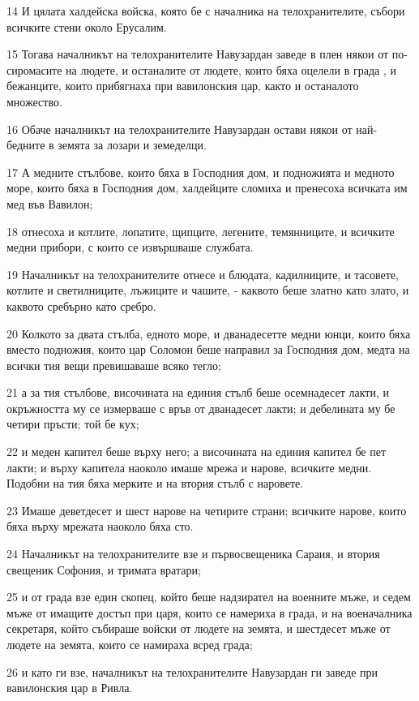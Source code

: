 \par 14 И цялата халдейска войска, която бе с началника на телохранителите, събори всичките стени около Ерусалим.
\par 15 Тогава началникът на телохранителите Навузардан заведе в плен някои от по-сиромасите на людете, и останалите от людете, които бяха оцелели в града , и бежанците, които прибягнаха при вавилонския цар, както и останалото множество.
\par 16 Обаче началникът на телохранителите Навузардан остави някои от най-бедните в земята за лозари и земеделци.
\par 17 А медните стълбове, които бяха в Господния дом, и подножията и медното море, които бяха в Господния дом, халдейците сломиха и пренесоха всичката им мед във Вавилон;
\par 18 отнесоха и котлите, лопатите, щипците, легените, темянниците, и всичките медни прибори, с които се извършваше службата.
\par 19 Началникът на телохранителите отнесе и блюдата, кадилниците, и тасовете, котлите и светилниците, лъжиците и чашите, - каквото беше златно като злато, и каквото сребърно като сребро.
\par 20 Колкото за двата стълба, едното море, и дванадесетте медни юнци, които бяха вместо подножия, които цар Соломон беше направил за Господния дом, медта на всички тия вещи превишаваше всяко тегло;
\par 21 а за тия стълбове, височината на единия стълб беше осемнадесет лакти, и окръжността му се измерваше с връв от дванадесет лакти; и дебелината му бе четири пръсти; той бе кух;
\par 22 и меден капител беше върху него; а височината на единия капител бе пет лакти; и върху капитела наоколо имаше мрежа и нарове, всичките медни. Подобни на тия бяха мерките и на втория стълб с наровете.
\par 23 Имаше деветдесет и шест нарове на четирите страни; всичките нарове, които бяха върху мрежата наоколо бяха сто.
\par 24 Началникът на телохранителите взе и първосвещеника Сараия, и втория свещеник Софония, и тримата вратари;
\par 25 и от града взе един скопец, който беше надзирател на военните мъже, и седем мъже от имащите достъп при царя, които се намериха в града, и на военачалника секретаря, който събираше войски от людете на земята, и шестдесет мъже от людете на земята, които се намираха всред града;
\par 26 и като ги взе, началникът на телохранителите Навузардан ги заведе при вавилонския цар в Ривла.
